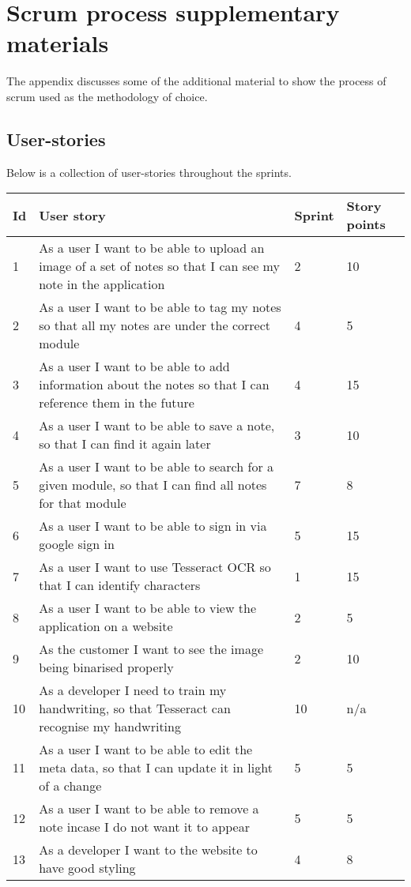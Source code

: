 \chapter{Scrum process supplementary materials}
The appendix discusses some of the additional material to show the process of scrum used as the methodology of choice.

\section{User-stories}
Below is a collection of user-stories throughout the sprints.

\begin{table}[h!]
\centering
\begin{tabular}{||p{1cm} p{10cm} p{1cm} p{1cm}||}
   \hline
 Id & User story & Sprint & Story points \\ [0.5ex]
 \hline\hline
 1 & As a user I want to be able to upload an image of a set of notes so that I can see my note in the application & 2	& 10 \\
 2 & As a user I want to be able to tag my notes so that  all my notes are under the correct module	& 4	 & 5 \\
 3&As a user I want to be able to add information about the notes so that I can reference them in the future&4&15 \\
 4&As a user I want to be able to save a note, so that I can find it again later&3&10 \\
 5&As a user I want to be able to search for a given module, so that I can find all notes for that module&7&8 \\
 6&As a user I want to be able to sign in via google sign in&5&15 \\
 7&As a user I want to use Tesseract OCR so that I can identify characters&1&15 \\
 8&As a user I want to be able to view the application on a website&2&5 \\
 9&As the customer I want to see the image being binarised properly&2&10 \\
 10&As a developer I need to train my handwriting, so that Tesseract can recognise my handwriting&10&n/a \\
 11&As a user I want to be able to edit the meta data, so that I can update it in light of a change&5&5 \\
 12&As a user I want to be able to remove a note incase I do not want it to appear&5&5 \\
 13&As a developer I want to the website to have good styling&4&8 \\

\end{tabular}
\end{table}
